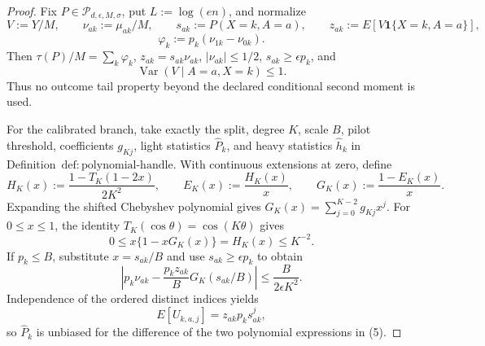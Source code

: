 \documentclass{article}
\begin{document}
\begin{proof}
Fix \(P\in\mathcal P_{d,\epsilon,M,\sigma}\), put \(L:=\log(en)\), and normalize
\[
 V:=Y/M,\qquad \nu_{ak}:=\mu_{ak}/M,\qquad
 s_{ak}:=P(X=k,A=a),\qquad
 z_{ak}:=E[V\mathbf1\{X=k,A=a\}],
\]
\[
 \varphi_k:=p_k(\nu_{1k}-\nu_{0k}).
\tag{1}
\]
Then \(\tau(P)/M=\sum_k\varphi_k\), \(z_{ak}=s_{ak}\nu_{ak}\), \(|\nu_{ak}|\le1/2\), \(s_{ak}\ge\epsilon p_k\), and
\[
 \operatorname{Var}(V\mid A=a,X=k)\le1.
\tag{2}
\]
Thus no outcome tail property beyond the declared conditional second moment is used.

For the calibrated branch, take exactly the split, degree \(K\), scale \(B\), pilot threshold, coefficients \(g_{Kj}\), light statistics \(\widehat P_k\), and heavy statistics \(\widehat h_k\) in Definition~\(\mathrm{def:polynomial\text{-}handle}\).  With continuous extensions at zero, define
\[
 H_K(x):=\frac{1-T_K(1-2x)}{2K^2},\qquad
 E_K(x):=\frac{H_K(x)}x,\qquad
 G_K(x):=\frac{1-E_K(x)}x.
\tag{3}
\]
Expanding the shifted Chebyshev polynomial gives \(G_K(x)=\sum_{j=0}^{K-2}g_{Kj}x^j\).  For \(0\le x\le1\), the identity \(T_K(\cos\theta)=\cos(K\theta)\) gives
\[
 0\le x\{1-xG_K(x)\}=H_K(x)\le K^{-2}.
\tag{4}
\]
If \(p_k\le B\), substitute \(x=s_{ak}/B\) and use \(s_{ak}\ge\epsilon p_k\) to obtain
\[
 \left|p_k\nu_{ak}-\frac{p_kz_{ak}}B G_K(s_{ak}/B)\right|
 \le\frac{B}{2\epsilon K^2}.
\tag{5}
\]
Independence of the ordered distinct indices yields
\[
 E[U_{k,a,j}]=z_{ak}p_ks_{ak}^j,
\tag{6}
\]
so \(\widehat P_k\) is unbiased for the difference of the two polynomial expressions in (5).


\end{proof}
\end{document}
